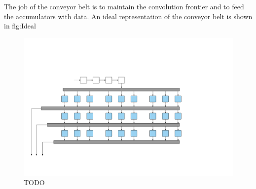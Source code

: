 The job of the conveyor belt is to maintain the convolution frontier and to feed the accumulators with data. An ideal representation of the conveyor belt is shown in fig:Ideal
\begin{figure}[h!]
    \includegraphics[width=\linewidth]{img/IdealFeeder.png}
    \caption{TODO}
    \label{fig:Contexts}
\end{figure}
